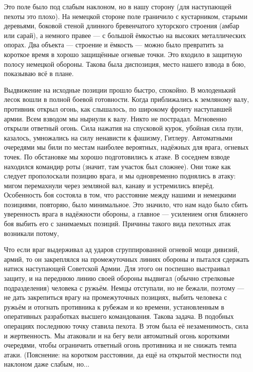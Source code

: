\label{6-1}
Это поле было под слабым наклоном, но в нашу сторону (для наступающей пехоты это плохо). На немецкой стороне поле граничило с кустарником, старыми деревьями, боковой стеной длинного бревенчатого хуторского строения (амбар или сарай), а немного правее — с большой ёмкостью на высоких металлических опорах. Два объекта — строение и ёмкость — можно было превратить за короткое время в хорошо защищённые огневые точки. Это входило в защитную полосу немецкой обороны. Такова была диспозиция, место нашего взвода в бою, показываю всё в плане.

\label{7-1}
Выдвижение на исходные позиции прошло быстро, спокойно. В молоденький лесок вошли в полной боевой готовности. Когда приближались к земляному валу, противник открыл огонь, как слышалось, по широкому фронту наступавшей армии. Всем взводом мы нырнули к валу. Никто не пострадал. Мгновенно открыли ответный огонь. Сила нажатия на спусковой курок, убойная сила пули, казалось, умножались на силу ненависти к фашизму, Гитлеру. Автоматными очередями мы били по местам наиболее вероятных, надёжных для врага, огневых точек. По обстановке мы хорошо подготовились к атаке. В соседнем взводе находился командир роты (значит, там участок был сложнее). Они тоже как следует прополоскали позицию врага, и мы одновременно поднялись в атаку: мигом перемахнули через земляной вал, канаву и устремились вперёд. Особенность боя состояла в том, что расстояние между нашими и немецкими позициями, повторяю, было минимальное. Это значило, что нам надо было сбить уверенность врага в надёжности обороны, а главное — усилением огня ближнего боя выбить его с занимаемых позиций. Причины такого вида пехотных атак возникали потому,


\label{8-1}

Что если враг выдерживал ад ударов сгруппированной огневой мощи дивизий, армий, то он закреплялся на промежуточных линиях обороны и пытался сдержать натиск наступающей Советской Армии. Для этого он поспешно выстраивал защиту, и на переднюю линию своей обороны выдвигал (обычно стрелковые подразделения) человека с ружьём. Немцы отступали, но не бежали, поэтому — не дать закрепиться врагу на промежуточных позициях, выбить человека с ружьём и отогнать противника к рубежам и ко времени, установленным в оперативных разработках высшего командования. Такова задача. В подобных операциях последнюю точку ставила пехота. В этом была её незаменимость, сила и жертвенность. Мы атаковали и на бегу вели автоматный огонь короткими очередями, чтобы ограничить ответный огонь противника и не снижать темпа атаки. (Пояснение: на коротком расстоянии, да ещё на открытой местности под наклоном даже слабым, но...


